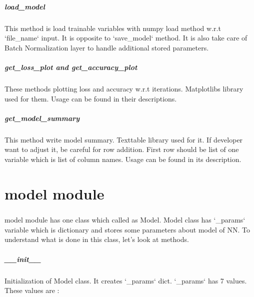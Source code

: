 \documentclass[12pt]{report}
\begin{document}
\paragraph{load\_model}
This method is load trainable variables with numpy load method w.r.t `file\_name` input. It is opposite to `save\_model` method. It is also take care of Batch Normalization layer to handle additional stored parameters.

\paragraph{get\_loss\_plot and get\_accuracy\_plot}
These methods plotting loss and accuracy w.r.t iterations. Matplotlibs library used for them. Usage can be found in their descriptions.

\paragraph{get\_model\_summary}
This method write model summary. Texttable library used for it. If developer want to adjust it, be careful for row addition. First row should be list of one variable which is list of column names. Usage can be found in its description.





\chapter{model module}

\paragraph{}
model module has one class which called as Model. Model class has `\_params` variable which is dictionary and stores some parameters about model of NN. To understand what is done in this class, let's look at methods.

\paragraph{\_\_init\_\_}
Initialization of Model class. It creates `\_params` dict. `\_params` has 7 values. These values are :
\end{document}
